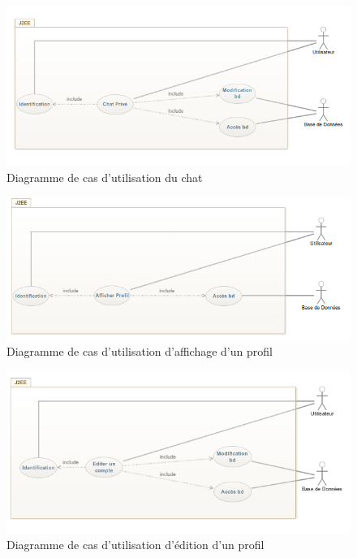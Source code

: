 \begin{figure}[ht!]
  \centering
   \caption{Diagramme de cas d'utilisation du chat}
   \includegraphics[scale=0.6]{cucp}
\end{figure}

\begin{figure}[ht!]
  \centering
   \caption{Diagramme de cas d'utilisation d'affichage d'un profil}
   \includegraphics[scale=0.6]{cuAP}
\end{figure}

\begin{figure}[ht!]
  \centering
   \caption{Diagramme de cas d'utilisation d'édition d'un profil}
   \includegraphics[scale=0.6]{cuEP}
\end{figure}

